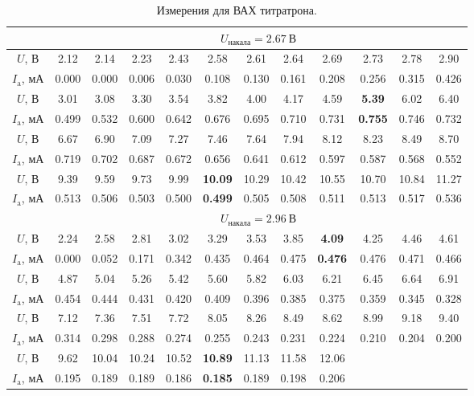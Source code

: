 \documentclass[a4paper,12pt]{article}
\begin{document}
\begin{table}[h]
\begin{tabular}{|c|c|c|c|c|c|c|c|c|c|c|c|}
\hline
                 & \multicolumn{11}{c|}{$U_\text{накала} =   2.67~\text{В}$}                             \\ \hline
$U$, В           & 2.12  & 2.14  & 2.23  & 2.43  & 2.58  & 2.61  & 2.64  & 2.69  & 2.73  & 2.78  & 2.90  \\ 
$I_\text{a}$, мА & 0.000 & 0.000 & 0.006 & 0.030 & 0.108 & 0.130 & 0.161 & 0.208 & 0.256 & 0.315 & 0.426 \\ \hline
$U$, В           & 3.01  & 3.08  & 3.30  & 3.54  & 3.82  & 4.00  & 4.17  & 4.59  & \textbf{5.39}  & 6.02  & 6.40  \\ 
$I_\text{a}$, мА & 0.499 & 0.532 & 0.600 & 0.642 & 0.676 & 0.695 & 0.710 & 0.731 & \textbf{0.755} & 0.746 & 0.732 \\ \hline
$U$, В           & 6.67  & 6.90  & 7.09  & 7.27  & 7.46  & 7.64  & 7.94  & 8.12  & 8.23  & 8.49  & 8.70  \\ 
$I_\text{a}$, мА & 0.719 & 0.702 & 0.687 & 0.672 & 0.656 & 0.641 & 0.612 & 0.597 & 0.587 & 0.568 & 0.552 \\ \hline
$U$, В           & 9.39  & 9.59  & 9.73  & 9.99  & \textbf{10.09} & 10.29 & 10.42 & 10.55 & 10.70 & 10.84 & 11.27 \\ 
$I_\text{a}$, мА & 0.513 & 0.506 & 0.503 & 0.500 & \textbf{0.499} & 0.505 & 0.508 & 0.511 & 0.513 & 0.517 & 0.536 \\ \hline
                 & \multicolumn{11}{c|}{$U_\text{накала} =   2.96~\text{В}$}                             \\ \hline
$U$, В           & 2.24  & 2.58  & 2.81  & 3.02  & 3.29  & 3.53  & 3.85  & \textbf{4.09}  & 4.25  & 4.46  & 4.61  \\ 
$I_\text{a}$, мА & 0.000 & 0.052 & 0.171 & 0.342 & 0.435 & 0.464 & 0.475 & \textbf{0.476} & 0.476 & 0.471 & 0.466 \\ \hline
$U$, В           & 4.87  & 5.04  & 5.26  & 5.42  & 5.60  & 5.82  & 6.03  & 6.21  & 6.45  & 6.64  & 6.91  \\ 
$I_\text{a}$, мА & 0.454 & 0.444 & 0.431 & 0.420 & 0.409 & 0.396 & 0.385 & 0.375 & 0.359 & 0.345 & 0.328 \\ \hline
$U$, В           & 7.12  & 7.36  & 7.51  & 7.72  & 8.05  & 8.26  & 8.49  & 8.62  & 8.99  & 9.18  & 9.40  \\ 
$I_\text{a}$, мА & 0.314 & 0.298 & 0.288 & 0.274 & 0.255 & 0.243 & 0.231 & 0.224 & 0.210 & 0.204 & 0.200 \\ \hline
$U$, В           & 9.62  & 10.04 & 10.24 & 10.52 & \textbf{10.89} & 11.13 & 11.58 & 12.06 &       &       &       \\ 
$I_\text{a}$, мА & 0.195 & 0.189 & 0.189 & 0.186 & \textbf{0.185} & 0.189 & 0.198 & 0.206 &       &       &       \\ \hline
\end{tabular}
\centering
\caption{Измерения для ВАХ титратрона.}
\end{table}
\end{document}
